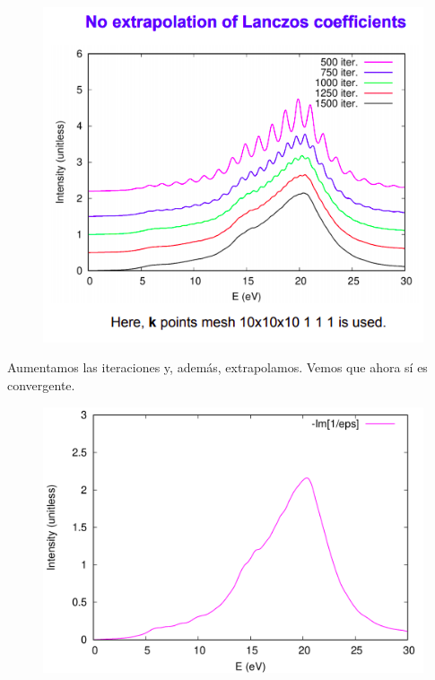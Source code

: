     \begin{figure}[H]
        \centering
        \includegraphics[scale = 0.7]{figs/D6/EELS_no_extra.png}
    \end{figure}

  Aumentamos las iteraciones y, además, extrapolamos. Vemos que ahora sí es convergente.

    \begin{figure}[H]
        \centering
        \includegraphics[scale = 0.30]{figs/D6/EELS_L.png}
    \end{figure}

